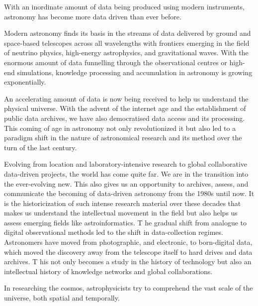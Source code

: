 With an inordinate amount of data being produced using modern instruments, astronomy has become more data driven than ever before.


Modern astronomy finds its basis in the streams of data delivered by ground and space-based telescopes across all wavelengths with frontiers emerging in the field of neutrino physics, high-energy astrophysics, and gravitational waves.
With the enormous amount of data funnelling through the observational centres or high-end simulations, knowledge processing and accumulation in astronomy is growing exponentially.


An accelerating amount of data is now being received to help us understand the physical universe. With the advent of the internet age and the establishment of public data archives, we have also democratised data access and its processing. This coming of age in astronomy not only revolutionized it but also led to a paradigm shift in the nature of astronomical research and its method over the turn of the last century.



Evolving from location and laboratory-intensive research to global collaborative data-driven projects, the world has come quite far.  We are in the transition into the ever-evolving new. This also gives us an opportunity to archives, assess, and communicate the becoming of data-driven astronomy from the 1980s until now. It is the historicization of such intense research material over these decades that makes us understand the intellectual movement in the field but also helps us assess emerging fields like astroinformatics.  T
he gradual shift from analogue to digital observational methods led to the shift in data-collection regimes.
Astronomers have moved from photographic, and electronic, to born-digital data, which moved the discovery away from the telescope itself to hard drives and data archives. T
his not only becomes a study in the history of technology but also an intellectual history of knowledge networks and global collaborations.


In researching the cosmos, astrophysicists try to comprehend the vast scale of the universe, both spatial and temporally.
